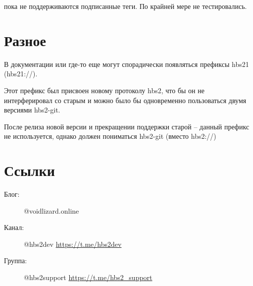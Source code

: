 \documentclass[11pt,a4paper]{article}
\begin{document}
пока не поддерживаются подписанные теги. По крайней мере не тестировались.

\section{Разное}

В документации или где-то еще могут спорадически появляться префиксы hbs21 (hbs21://).

Этот префикс был присвоен новому протоколу hbs2, что бы он не интерферировал
со старым и можно было бы одновременно пользоваться двумя версиями hbs2-git.

После релиза новой версии и прекращении поддержки старой -- данный префикс
не используется, однако должен пониматься hbs2-git (вместо hbs2://)

\section{Ссылки}

\begin{description}
  \item[Блог:] @voidlizard.online
  \item[Канал:]  @hbs2dev \url{https://t.me/hbs2dev}
  \item[Группа:] @hbs2support \url{https://t.me/hbs2_support}
\end{description}
\end{document}

